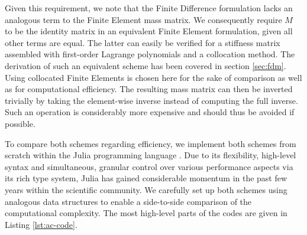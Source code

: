 \documentclass[asi,article,submit,moreauthors]{Definitions/mdpi}
\begin{document}
Given this requirement, we note that the Finite Difference formulation lacks an analogous term to the Finite Element mass matrix. 
We consequently require $M$ to be the identity matrix in an equivalent Finite Element formulation, given all other terms are equal.
The latter can easily be verified for a stiffness matrix assembled with first-order Lagrange polynomials and a collocation method.
The derivation of such an equivalent scheme has been covered in section \ref{sec:fdm}.
Using collocated Finite Elements is chosen here for the sake of comparison as well as for computational efficiency.
The resulting mass matrix can then be inverted trivially by taking the element-wise inverse instead of computing the full inverse.
Such an operation is considerably more expensive and should thus be avoided if possible.

To compare both schemes regarding efficiency, we implement both schemes from scratch within the Julia programming language \cite{bezansonJuliaFreshApproach2017}.
Due to its flexibility, high-level syntax and simultaneous, granular control over various performance aspects via its rich type system, Julia has gained considerable momentum in the past few years within the scientific community.
We carefully set up both schemes using analogous data structures to enable a side-to-side comparison of the computational complexity.
The most high-level parts of the codes are given in Listing \ref{lst:ac-code}.
\end{document}
